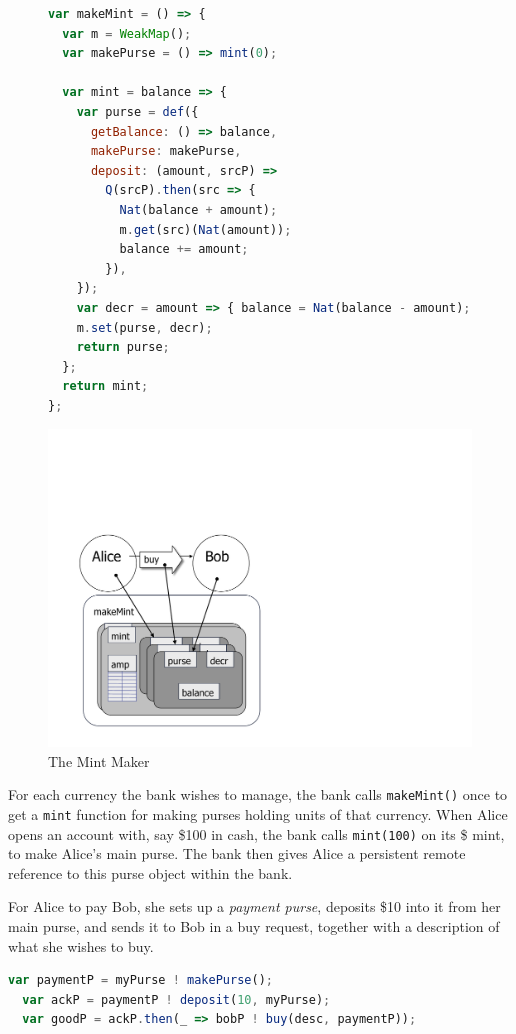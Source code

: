 \documentclass{llncs}
\begin{document}
\begin{figure}[t]
\begin{minipage}[t]{0.54\linewidth}
\begin{lstlisting}[language=javascript]
var makeMint = () => {
  var m = WeakMap();
  var makePurse = () => mint(0);
  
  var mint = balance => {
    var purse = def({
      getBalance: () => balance,
      makePurse: makePurse,
      deposit: (amount, srcP) =>
        Q(srcP).then(src => {
          Nat(balance + amount);
          m.get(src)(Nat(amount)); 
          balance += amount;
        }),
    });
    var decr = amount => { balance = Nat(balance - amount); };
    m.set(purse, decr);
    return purse;
  };
  return mint;
};
\end{lstlisting}
\end{minipage}
\begin{minipage}[t]{0.48\linewidth}
\vspace{0pt}
\includegraphics[scale=0.3]{bw-mint.pdf}
\end{minipage}
\caption{The Mint Maker}
\label{makeMint}
\end{figure}

For each currency the bank wishes to manage, the bank calls {\tt makeMint()} once to get a {\tt mint} function for making purses holding units of that currency. When Alice opens an account with, say \$100 in cash, the bank calls {\tt mint(100)} on its \$ mint, to make Alice's main purse. The bank then gives Alice a persistent remote reference to this purse object within the bank.

For Alice to pay Bob, she sets up a \emph{payment purse}, deposits \$10 into it from her main purse, and sends it to Bob in a buy request, together with a description of what she wishes to buy.
\begin{lstlisting}[language=JavaScript,numbers=none]
  var paymentP = myPurse ! makePurse();
  var ackP = paymentP ! deposit(10, myPurse);
  var goodP = ackP.then(_ => bobP ! buy(desc, paymentP));
\end{lstlisting}
\end{document}

